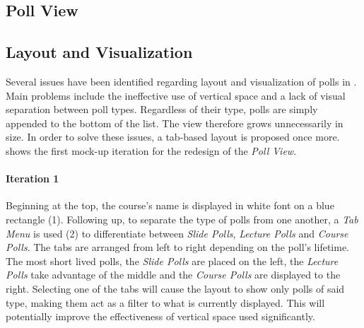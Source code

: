 \subsection{Poll View}

\subsection{Layout and Visualization}
Several issues have been identified regarding layout and visualization of polls in . Main problems include the ineffective use of vertical space and a lack of visual separation between poll types. Regardless of their type, polls are simply appended to the bottom of the list.
The view therefore grows unnecessarily in size.
In order to solve these issues, a tab-based layout is proposed once more. 
  shows the first mock-up iteration for the redesign of the \emph{Poll View}.
\paragraph{Iteration 1}
Beginning at the top, the course's name is displayed in white font on a blue rectangle (1). Following up, to separate the type of polls from one another, a \emph{Tab Menu} is used (2) to differentiate between \emph{Slide Polls}, \emph{Lecture Polls} and \emph{Course Polls}. The tabs are arranged from left to right depending on the poll's lifetime. The most short lived polls, the \emph{Slide Polls} are placed on the left, the \emph{Lecture Polls} take advantage of the middle and the \emph{Course Polls} are displayed to the right. Selecting one of the tabs will cause the layout to show only polls of said type, making them act as a filter to what is currently displayed. This will potentially improve the effectiveness of vertical space used significantly. 

